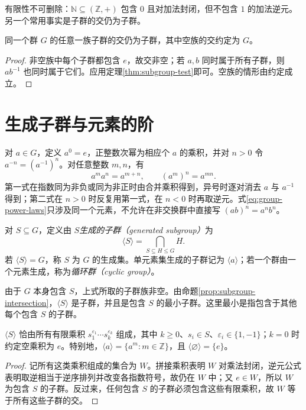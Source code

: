 有限性不可删除：$\mathbb N\subseteq(\mathbb Z,+)$ 包含 $0$ 且对加法封闭，但不包含 $1$ 的加法逆元。另一个常用事实是子群的交仍为子群。

\begin{proposition}[子群的交]\label{prop:subgroup-intersection}
同一个群 $G$ 的任意一族子群的交仍为子群，其中空族的交约定为 $G$。
\end{proposition}
\begin{proof}
非空族中每个子群都包含 $e$，故交非空；若 $a,b$ 同时属于所有子群，则 $ab^{-1}$ 也同时属于它们。应用定理\ref{thm:subgroup-test}即可。空族的情形由约定成立。
\end{proof}

\section{生成子群与元素的阶}\label{sec:generated-subgroups}

对 $a\in G$，定义 $a^0=e$，正整数次幂为相应个 $a$ 的乘积，并对 $n>0$ 令 $a^{-n}=(a^{-1})^n$。对任意整数 $m,n$，有
\begin{equation}\label{eq:group-power-laws}
  a^ma^n=a^{m+n},\qquad (a^m)^n=a^{mn}.
\end{equation}
第一式在指数同为非负或同为非正时由合并乘积得到，异号时逐对消去 $a$ 与 $a^{-1}$ 得到；第二式在 $n>0$ 时反复用第一式，在 $n<0$ 时再取逆元。式\eqref{eq:group-power-laws}只涉及同一个元素，不允许在非交换群中直接写 $(ab)^n=a^nb^n$。

\begin{definition}[生成子群]
对 $S\subseteq G$，定义由 $S$\emph{生成的子群（generated subgroup）}为
\[
  \langle S\rangle=\bigcap_{S\subseteq H\leq G}H.
\]
若 $\langle S\rangle=G$，称 $S$ 为 $G$ 的生成集。单元素集生成的子群记为 $\langle a\rangle$；若一个群由一个元素生成，称为\emph{循环群（cyclic group）}。
\end{definition}

由于 $G$ 本身包含 $S$，上式所取的子群族非空。由命题\ref{prop:subgroup-intersection}，$\langle S\rangle$ 是子群，并且是包含 $S$ 的最小子群。这里最小是指包含于其他每个包含 $S$ 的子群。

\begin{proposition}[生成子群的元素描述]\label{prop:generated-words}
$\langle S\rangle$ 恰由所有有限乘积 $s_1^{\varepsilon_1}\cdots s_k^{\varepsilon_k}$ 组成，其中 $k\geq0$、$s_i\in S$、$\varepsilon_i\in\{1,-1\}$；$k=0$ 时约定空乘积为 $e$。特别地，$\langle a\rangle=\{a^m:m\in\mathbb Z\}$，且 $\langle\varnothing\rangle=\{e\}$。
\end{proposition}
\begin{proof}
记所有这类乘积组成的集合为 $W$。拼接乘积表明 $W$ 对乘法封闭，逆元公式表明取逆相当于逆序排列并改变各指数符号，故仍在 $W$ 中；又 $e\in W$，所以 $W$ 为包含 $S$ 的子群。反过来，任何包含 $S$ 的子群必须包含这些有限乘积，故 $W$ 等于所有这些子群的交。
\end{proof}

